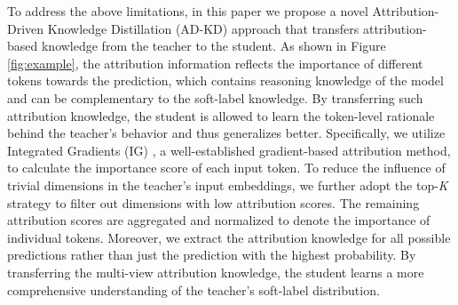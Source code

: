 \documentclass[11pt]{article}
\begin{document}

To address the above limitations, in this paper we propose a novel Attribution-Driven Knowledge Distillation (AD-KD) approach that transfers attribution-based knowledge from the teacher to the student.
As shown in Figure \ref{fig:example}, the attribution information reflects the importance of different tokens towards the prediction, which contains reasoning knowledge of the model and can be complementary to the soft-label knowledge. By transferring such attribution knowledge, the student is allowed to learn the token-level rationale behind the teacher's behavior and thus generalizes better. Specifically, we utilize Integrated Gradients (IG) \citep{sundararajan2017axiomatic}, a well-established gradient-based attribution method, to calculate the importance score of each input token. To reduce the influence of trivial dimensions in the teacher's input embeddings, we further adopt the top-\textit{K} strategy to filter out dimensions with low attribution scores. The remaining attribution scores are aggregated and normalized to denote the importance of individual tokens. Moreover, we extract the attribution knowledge for all possible predictions rather than just the prediction with the highest probability. By transferring the multi-view attribution knowledge, the student learns a more comprehensive understanding of the teacher's soft-label distribution.
\end{document}
